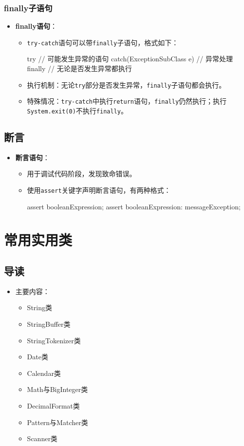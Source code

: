 \documentclass[a4paper, 10pt]{ctexart}
\begin{document}
\subsubsection{finally子语句}
\begin{itemize}
  \item \textbf{finally语句}：
  \begin{itemize}
    \item \texttt{try-catch}语句可以带\texttt{finally}子语句，格式如下：
    \begin{codeblock}
try {
    // 可能发生异常的语句
} catch(ExceptionSubClass e) {
    // 异常处理
} finally {
    // 无论是否发生异常都执行
}
    \end{codeblock}
    \item 执行机制：无论\texttt{try}部分是否发生异常，\texttt{finally}子语句都会执行。
    \item 特殊情况：\texttt{try-catch}中执行\texttt{return}语句，\texttt{finally}仍然执行；执行\texttt{System.exit(0)}不执行\texttt{finally}。
  \end{itemize}
\end{itemize}

\subsection{断言}
\begin{itemize}
  \item \textbf{断言语句}：
  \begin{itemize}
    \item 用于调试代码阶段，发现致命错误。
    \item 使用\texttt{assert}关键字声明断言语句，有两种格式：
    \begin{codeblock}
assert booleanExpression;
assert booleanExpression: messageException;
    \end{codeblock}
  \end{itemize}
\end{itemize}

\section{常用实用类}

\subsection{导读}
\begin{itemize}
  \item 主要内容：
  \begin{itemize}
    \item String类
    \item StringBuffer类
    \item StringTokenizer类
    \item Date类
    \item Calendar类
    \item Math与BigInteger类
    \item DecimalFormat类
    \item Pattern与Matcher类
    \item Scanner类
  \end{itemize}
\end{itemize}
\end{document}
